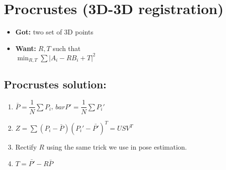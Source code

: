 \section{Procrustes (3D-3D registration)}
\begin{itemize}
  \item \textbf{Got:} two set of 3D points
  \item \textbf{Want:} $R, T$ such that\\
    $\min_{R,T} \sum |A_i - R B_i +T|^2$
\end{itemize}

\subsection*{Procrustes solution:}
\begin{enumerate}
  \item $\bar{P} = \dfrac{1}{N} \sum P_i$,
    $bar{P'} = \dfrac{1}{N} \sum P_i'$\\
  \item $Z = \sum(P_i - \bar{P})(P_i' - \bar{P'})^T = U S V^T$
  \item Rectify $R$ using the same trick we use in pose estimation.
  \item $T = \bar{P'} - R \bar{P}$
\end{enumerate}

% 
% 
% 
% 
% 


